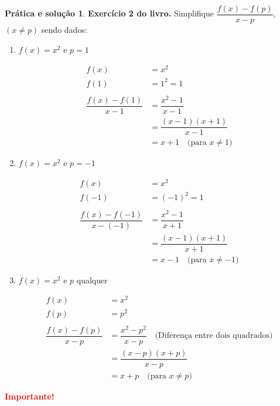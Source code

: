 \documentclass[12pt,openright,twoside,a4paper]{article}
\theoremstyle{definition}
\newtheorem{practice}{Prática e solução}[section]
\begin{document}
	\begin{practice}
		
		\textbf{Exercício 2 do livro.} Simplifique $\dfrac{f(x) - f(p)}{x - p}$, $(x \neq p)$ sendo dados:
		
		\begin{enumerate}
			\item[a)] $f(x) = x^2$ e $p = 1$
			
			\begin{align*}
				f(x) &= x^2 \\
				f(1) &= 1^2 = 1 \\
				\\
				\dfrac{f(x) - f(1)}{x - 1} &= \dfrac{x^2 - 1}{x - 1} \\
				&= \dfrac{(x - 1)(x + 1)}{x - 1} \\
				&= x + 1 \quad \text{(para } x \ne 1\text{)}
			\end{align*}
			
			\item[b)] $f(x) = x^2$ e $p = -1$
			
			\begin{align*}
				f(x) &= x^2 \\
				f(-1) &= (-1)^2 = 1 \\
				\\
				\dfrac{f(x) - f(-1)}{x - (-1)} &= \dfrac{x^2 - 1}{x + 1} \\
				&= \dfrac{(x - 1)(x + 1)}{x + 1} \\
				&= x - 1 \quad \text{(para } x \ne -1\text{)}
			\end{align*}
			
			\item[c)] $f(x) = x^2$ e $p$ qualquer
			
			\begin{align*}
				f(x) &= x^2 \\
				f(p) &= p^2 \\
				\\
				\dfrac{f(x) - f(p)}{x - p} &= \dfrac{x^2 - p^2}{x - p} \quad \text{(Diferença entre dois quadrados)}\\
				&= \dfrac{(x - p)(x + p)}{x - p} \\
				&= x + p \quad \text{(para } x \ne p\text{)}
			\end{align*}
			
		\end{enumerate}
		
		\begin{snugshade}
			\textbf{\textcolor{red}{Importante!}}
			

\end{snugshade}
\end{practice}
\end{document}

